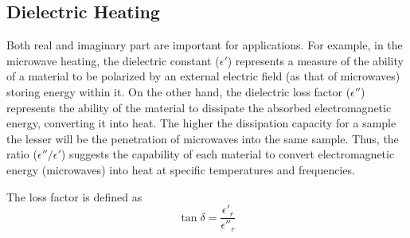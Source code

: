 \documentclass[%
 aip,
 amsmath,amssymb,
 reprint, floatfix%
]{revtex4-1}
\begin{document}
    \subsection{Dielectric Heating}
    Both real and imaginary part are important for applications. For example, in the microwave heating, the dielectric constant ($\epsilon'$) represents a measure of the ability of a material to be polarized by an external electric field (as that of microwaves) storing energy within it. On the other hand, the dielectric loss factor ($\epsilon''$) represents the ability of the material to dissipate the absorbed electromagnetic energy, converting it into heat. The higher the dissipation capacity for a sample the lesser will be the penetration of microwaves into the same sample. Thus, the ratio ($\epsilon''/\epsilon'$) suggests the capability of each material to convert electromagnetic energy (microwaves) into heat at specific temperatures and frequencies.
    \par
    The loss factor is defined as
    \begin{equation}
        \tan \delta = \dfrac{\epsilon'_r}{\epsilon''_r}
    \end{equation}
    
\end{document}
